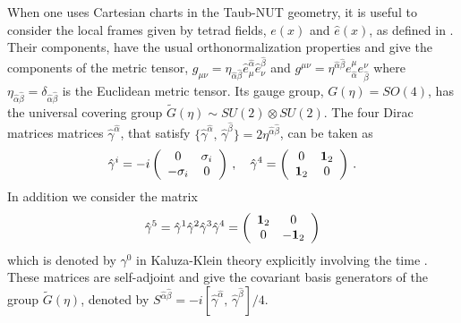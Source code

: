 \documentclass[a4paper,12pt]{article}
\begin{document}
When one uses Cartesian charts in the Taub-NUT geometry, it is useful 
to consider the local frames given by tetrad fields, $e(x)$ and $\hat e(x)$, 
as defined in \cite{P}. Their components, have the usual orthonormalization 
properties and give the components of the metric tensor,  
$g_{\mu\nu}=\eta_{\hat\alpha \hat\beta}\hat 
e^{\hat\alpha}_{\mu}\hat e^{\hat\beta}_{\nu}$ and 
$g^{\mu\nu}=\eta^{\hat\alpha \hat\beta} e_{\hat\alpha}^{\mu}
e_{\hat\beta}^{\nu}$ where 
$\eta_{\hat\alpha \hat\beta} =\delta_{\hat\alpha \hat\beta} $ is the 
Euclidean  metric tensor.  Its gauge group,  $G(\eta)=SO(4)$,  
has  the  universal covering group     
$\tilde G(\eta)\sim SU(2)\otimes SU(2)$. The four Dirac matrices 
matrices  $\hat\gamma^{\hat\alpha}$, that  satisfy 
$\{ \hat\gamma^{\hat\alpha},\, \hat\gamma^{\hat\beta} \}
=2\eta^{\hat\alpha \hat\beta}$, can be taken as  
\begin{equation}\label{(gammai)} 
\hat\gamma^i = -i
\left(
\begin{array}{cc}
0&\sigma_i\\
-\sigma_i&0
\end{array}\right)\,,\quad  
\hat\gamma^4 =
\left(
\begin{array}{cc}
0&{\bf 1}_2\\
{\bf 1}_2&0
\end{array}\right)\,.
\end{equation}
In addition we consider the matrix
\begin{equation}\label{(gamma5)} 
\hat\gamma^5 = \hat\gamma^1\hat\gamma^2\hat\gamma^3\hat\gamma^4 =
\left(
\begin{array}{cc}
{\bf 1}_2&0\\
0&-{\bf 1}_2
\end{array}\right)
\end{equation}
which is denoted by $\gamma^{0}$ in Kaluza-Klein theory explicitly involving 
the time \cite{CV2}.
These matrices are self-adjoint  
and give the covariant basis generators of the group $\tilde G(\eta)$, 
denoted by  $S^{\hat\alpha \hat\beta}=-i 
[\hat\gamma^{\hat\alpha},\, \hat\gamma^{\hat\beta}]/4$.
\end{document}
